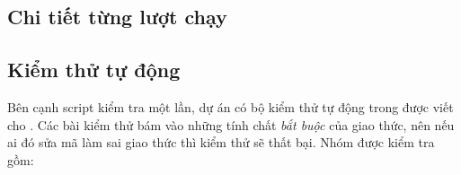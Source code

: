 \subsection{Chi tiết từng lượt chạy}
\label{sec:appendix-perrun}



\subsection{Kiểm thử tự động}
\label{sec:appendix-tests}

Bên cạnh script kiểm tra một lần, dự án có bộ kiểm thử tự động trong 
được viết cho . Các bài kiểm thử bám vào những tính chất \emph{bắt buộc} của giao
thức, nên nếu ai đó sửa mã làm sai giao thức thì kiểm thử sẽ thất bại. Nhóm được kiểm tra gồm:

